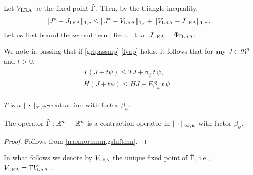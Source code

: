\documentclass[twocolumn]{IEEEtran}
\begin{document}
Let $V_{\text{\sc LRA}}$ be the fixed point $\hat{\Gamma}$.
Then, by the triangle inequality,
\begin{align*}
\|J^*-J_{\text{\sc LRA}}\|_{1,c} \le \|J^*-V_{\text{\sc LRA}}\|_{1,c} +\|V_{\text{\sc LRA}}-J_{\text{\sc LRA}}\|_{1,c}\,.
\end{align*}
Let us first bound the second term. Recall that $J_{\text{\sc LRA}} = \Phi r_{\text{\sc LRA}}$.

We note in passing that if \cref{grlpassmp}-\eqref{lyap} holds, it follows that for any $J\in \Re^n$ and $t>0$,
\begin{align}\label{eq:psilin}
\begin{split}
T(J+ t \psi ) \le TJ + \beta_{\psi}\,t\,  \psi,\\
H(J+ t \psi ) \le HJ + E \beta_{\psi}\,t\,  \psi\,.
\end{split}
\end{align}
\fi
%

\noindent



\begin{corollary}\label{tmaxnormmn}
$T$ is a $\|\cdot\|_{\infty,\psi}$-contraction with factor $\beta_{\psi}$.
\end{corollary}

\begin{comment}
\begin{theorem}\label{gmaxcontramn}
The operator $\Gamma  \colon \Re^n\ra \Re^n$ is a contraction operator in $\norm{\cdot}_{\mn}$ with factor $\beta_{\psi}$.
\end{theorem}
\end{comment}
\begin{theorem}\label{hgmaxcontramn}
The operator $\hat{\Gamma}:\mathbb{R}^n\to\mathbb{R}^n$  is a contraction operator in $\|\cdot\|_{\infty,\psi}$ with factor $\beta_{\psi}$.
\end{theorem}
\begin{proof}
Follows from \cref{maxnormmn,gshiftmn}.
\begin{comment}
We already know that $\hg$ is monotone. That $\hg$ satisfies~\cref{eq:shiftmn}
with $\beta = \beta_{\psi}$ follows similarly to the argument used in  \cref{tgshift}
with modifications similar to those introduced in the proof of \cref{gshiftmn}.
Then, \cref{gmaxcontramn} gives the desired result.
\end{comment}
\end{proof}
In what follows we denote by $V_{\text{\sc LRA}}$ the unique fixed point of $\hat{\Gamma}$, i.e., $V_{\text{\sc LRA}} = \hat{\Gamma} V_{\text{\sc LRA}}\,$.
\end{document}
